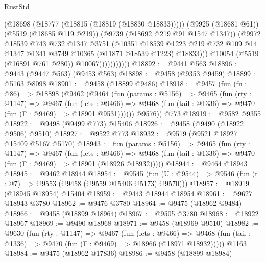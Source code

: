 \begin{lexlean}{RustStd}
\begin{coremodule}
                            (@18698 (@18777 (@18815 (@18819 (@18830 @18833)))))
                            (@9925 (@18681 @61))
                            (@5519 (@18685 @119 @219))
                            (@9739 (@18692 @219 @91 @1547 @1347))
                            (@9972
                              @18539
                              @743
                              @732
                              @1347
                              @3751
                              (@10351
                                @18539
                                @1223
                                @219
                                @732
                                @109
                                @14
                                @1347
                                @1341
                                @3749
                                @10365
                                (@11871 @18539 @1223)
                                @18833)))
                          @10054
                          (@5519 (@16891 @761 @280))
                          @10067)))))))))))
@18892 := @9441 @563
@18896 := @9443 (@9447 @563) (@9453 @563)
@18898 := @9458 (@9353 @9459)
@18899 := @5163 @8098
@18901 := @9458 (@18899 @9486)
@18918 := @9457
    (fun (fn : @86) =>
    @18898
      (@9462
        (@9464
          (fun (params : @5156) =>
          @9465
            (fun (rty : @1147) =>
            @9467
              (fun (lets : @9466) =>
              @9468 (fun (tail : @1336) => @9470 (fun (Γ : @9469) => @18901 @9531))))))
        @9576))
    @773
@18919 := @9582 @9355
@18922 := @9498 (@9499 @773) @15406
@18926 := @9458 (@9490 (@18922 @9506) @9510)
@18927 := @9522 @773
@18932 := @9519 (@9521 @18927 @15409 @5167 @5170)
@18943 := fun (params : @5156) =>
  @9465
    (fun (rty : @1147) =>
    @9467
      (fun (lets : @9466) =>
      @9468 (fun (tail : @1336) => @9470 (fun (Γ : @9469) => @18901 (@18926 @18932)))))
@18944 := @9464 @18943
@18945 := @9462 @18944
@18954 := @9545
    (fun (U : @9544) => @9546 (fun (t : @7) => @9553 (@9458 (@9559 @15406 @5173) @9570)))
@18957 := @18919 (@18945 @18954) @15404
@18959 := @9443 @18944 @18954
@18961 := @9627 @18943 @3780
@18962 := @9476 @3780
@18964 := @9475 (@18962 @9484)
@18966 := @9458 (@18899 @18964)
@18967 := @9505 @3780
@18968 := @18922 @18967
@18969 := @9490 @18968
@18971 := @9458 (@18969 @9510)
@18982 := @9630
    (fun (rty : @1147) =>
    @9467
      (fun (lets : @9466) =>
      @9468 (fun (tail : @1336) => @9470 (fun (Γ : @9469) => @18966 (@18971 @18932)))))
    @1163
@18984 := @9475 (@18962 @17836)
@18986 := @9458 (@18899 @18984)

\end{coremodule}
\end{lexlean}
